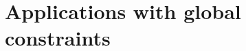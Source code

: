 



\label{doc:solver}\hypertarget{doc:solver}{}
\label{doc:advanced}\hypertarget{doc:advanced}{}
\chapter{Applications with global constraints}\label{doc:applications}\hypertarget{doc:applications}{}


